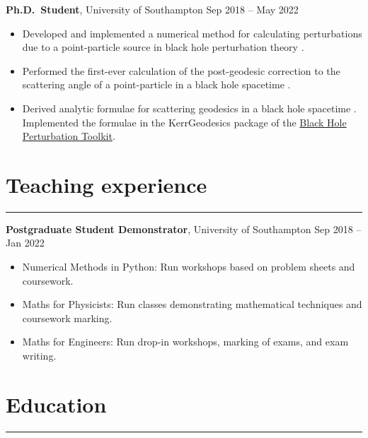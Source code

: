 \documentclass[10.5pt, oneside]{article}   	%
\begin{document}
\textbf{Ph.D.\ Student}, University of Southampton \hfill Sep 2018 -- May 2022\\ 
\vspace{-5mm}
\begin{itemize}
\item Developed and implemented a numerical method for calculating perturbations due to a point-particle source in black hole perturbation theory \cite{Barack:2022pde,Long:2021ufh}.
\item Performed the first-ever calculation of the post-geodesic correction to the scattering angle of a point-particle in a black hole spacetime \cite{Barack:2022pde}.
\item Derived analytic formulae for scattering geodesics in a black hole spacetime \cite{Long:2021ufh}. Implemented the formulae in the KerrGeodesics package of the \href{https://bhptoolkit.org/}{Black Hole Perturbation Toolkit}.
\end{itemize}


{\color{Sectioncolour}
\section*{Teaching experience}
\vspace{-3mm}
\noindent\rule{\linewidth}{0.6pt}}

\textbf{Postgraduate Student Demonstrator}, University of Southampton \hfill Sep 2018 -- Jan 2022\\ \vspace{-5mm}
\begin{itemize}
\item Numerical Methods in Python: Run workshops based on problem sheets and coursework.
\item Maths for Physicists: Run classes demonstrating mathematical techniques and coursework marking.
\item Maths for Engineers: Run drop-in workshops, marking of exams, and exam writing.
\end{itemize}


{\color{Sectioncolour}
\section*{Education}
\vspace{-3mm}
\noindent\rule{\linewidth}{0.6pt}}
\end{document}
